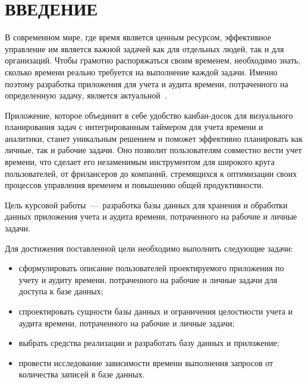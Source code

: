 \chapter*{ВВЕДЕНИЕ}


В современном мире, где время является ценным ресурсом, эффективное управление им является важной задачей как для отдельных людей, так и для организаций.
Чтобы грамотно распоряжаться своим временем, необходимо знать, сколько времени реально требуется на выполнение каждой задачи. Именно поэтому разработка приложения для учета и аудита времени, потраченного на определенную задачу, является актуальной~\cite{intro}.

Приложение, которое объединит в себе удобство канбан-досок для визуального планирования задач с интегрированным таймером для учета времени и аналитики, станет уникальным решением и поможет эффективно планировать как личные, так и рабочие задачи. Оно позволит пользователям совместно вести учет времени, что сделает его незаменимым инструментом для широкого круга пользователей, от фрилансеров до компаний, стремящихся к оптимизации своих процессов управления временем и повышению общей продуктивности.

Цель курсовой работы~---~разработка базы данных для хранения и обработки данных приложения учета и аудита времени, потраченного на рабочие и личные задачи.

Для достижения поставленной цели необходимо выполнить следующие задачи:
\begin{itemize}
	\item сформулировать описание пользователей проектируемого приложения по учету и аудиту времени, потраченного на рабочие и личные задачи для доступа к базе данных;
	\item спроектировать сущности базы данных и ограничения целостности учета и аудита времени, потраченного на рабочие и личные задачи;
	\item выбрать средства реализации и разработать базу данных и приложение;
	\item провести исследование зависимости времени выполнения запросов от количества записей в базе данных.
\end{itemize}


